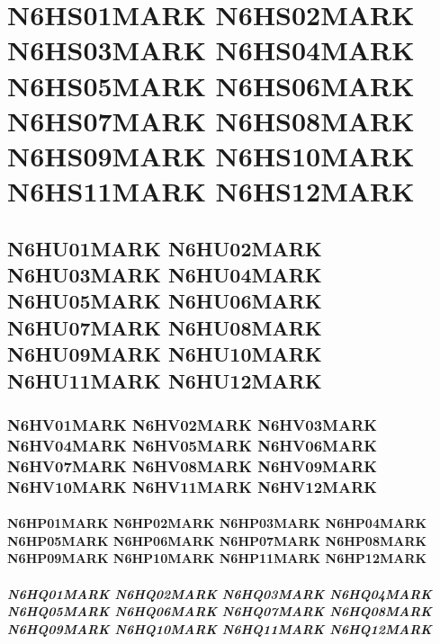 \documentclass{abntexto-ufc}
\begin{document}
\textual

\section{N6HS01MARK N6HS02MARK N6HS03MARK N6HS04MARK N6HS05MARK N6HS06MARK N6HS07MARK N6HS08MARK N6HS09MARK N6HS10MARK N6HS11MARK N6HS12MARK}

\clearpage
\subsection{N6HU01MARK N6HU02MARK N6HU03MARK N6HU04MARK N6HU05MARK N6HU06MARK N6HU07MARK N6HU08MARK N6HU09MARK N6HU10MARK N6HU11MARK N6HU12MARK}

\clearpage
\subsubsection{N6HV01MARK N6HV02MARK N6HV03MARK N6HV04MARK N6HV05MARK N6HV06MARK N6HV07MARK N6HV08MARK N6HV09MARK N6HV10MARK N6HV11MARK N6HV12MARK}

\clearpage
\paragraph{N6HP01MARK N6HP02MARK N6HP03MARK N6HP04MARK N6HP05MARK N6HP06MARK N6HP07MARK N6HP08MARK N6HP09MARK N6HP10MARK N6HP11MARK N6HP12MARK}

\clearpage
\subparagraph{N6HQ01MARK N6HQ02MARK N6HQ03MARK N6HQ04MARK N6HQ05MARK N6HQ06MARK N6HQ07MARK N6HQ08MARK N6HQ09MARK N6HQ10MARK N6HQ11MARK N6HQ12MARK}
\end{document}
